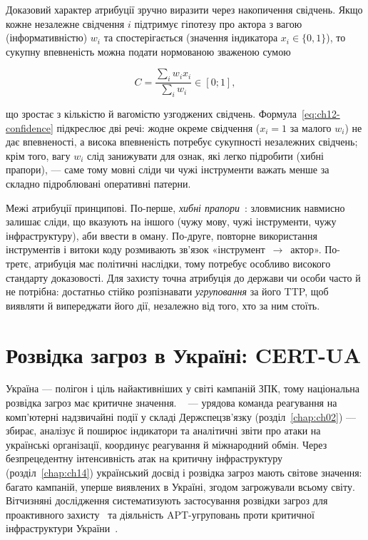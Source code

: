 Доказовий характер атрибуції зручно виразити через накопичення свідчень. Якщо кожне незалежне свідчення $i$ підтримує гіпотезу про актора з вагою (інформативністю) $w_i$ та спостерігається (значення індикатора $x_i\in\{0,1\}$), то сукупну впевненість можна подати нормованою зваженою сумою

\begin{equation}
C = \frac{\sum_i w_i x_i}{\sum_i w_i} \in [0;1],
\label{eq:ch12-confidence}
\end{equation}

що зростає з кількістю й вагомістю узгоджених свідчень. Формула~\eqref{eq:ch12-confidence} підкреслює дві речі: жодне окреме свідчення ($x_i=1$ за малого $w_i$) не дає впевненості, а висока впевненість потребує сукупності незалежних свідчень; крім того, вагу $w_i$ слід занижувати для ознак, які легко підробити (хибні прапори), --- саме тому мовні сліди чи чужі інструменти важать менше за складно підроблювані оперативні патерни.

Межі атрибуції принципові. По-перше, \emph{хибні прапори}~\cite{ch12:attribution}: зловмисник навмисно залишає сліди, що вказують на іншого (чужу мову, чужі інструменти, чужу інфраструктуру), аби ввести в оману. По-друге, повторне використання інструментів і витоки коду розмивають зв'язок «інструмент~$\to$~актор». По-третє, атрибуція має політичні наслідки, тому потребує особливо високого стандарту доказовості. Для захисту точна атрибуція до держави чи особи часто й не потрібна: достатньо стійко розпізнавати \emph{угруповання} за його TTP, щоб виявляти й випереджати його дії, незалежно від того, хто за ним стоїть.

\section{Розвідка загроз в Україні: CERT-UA}\label{sec:ch12-ukraine}

Україна --- полігон і ціль найактивніших у світі кампаній ЗПК, тому національна розвідка загроз має критичне значення. ~\cite{cert-ua} --- урядова команда реагування на комп'ютерні надзвичайні події у складі Держспецзв'язку (розділ~\ref{chap:ch02}) --- збирає, аналізує й поширює індикатори та аналітичні звіти про атаки на українські організації, координує реагування й міжнародний обмін. Через безпрецедентну інтенсивність атак на критичну інфраструктуру (розділ~\ref{chap:ch14}) український досвід і розвідка загроз мають світове значення: багато кампаній, уперше виявлених в Україні, згодом загрожували всьому світу. Вітчизняні дослідження систематизують застосування розвідки загроз для проактивного захисту~\cite{ch12:ti-ua} та діяльність APT-угруповань проти критичної інфраструктури України~\cite{ch12:apt-ua}.

